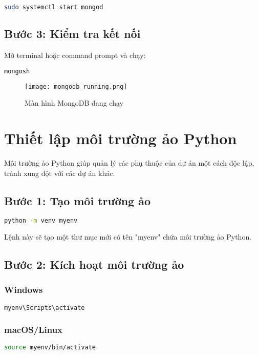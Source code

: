 \documentclass[12pt,a4paper]{article}
\begin{document}
\begin{lstlisting}[language=bash]
sudo systemctl start mongod
\end{lstlisting}

\subsection{Bước 3: Kiểm tra kết nối}

Mở terminal hoặc command prompt và chạy:

\begin{lstlisting}[language=bash]
mongosh
\end{lstlisting}

\begin{figure}[h]
    \centering
    \texttt{[image: mongodb\_running.png]}
    \caption{Màn hình MongoDB đang chạy}
    \label{fig:mongodb-running}
\end{figure}

\section{Thiết lập môi trường ảo Python}

Môi trường ảo Python giúp quản lý các phụ thuộc của dự án một cách độc lập, tránh xung đột với các dự án khác.

\subsection{Bước 1: Tạo môi trường ảo}

\begin{lstlisting}[language=bash]
python -m venv myenv
\end{lstlisting}

Lệnh này sẽ tạo một thư mục mới có tên "myenv" chứa môi trường ảo Python.

\subsection{Bước 2: Kích hoạt môi trường ảo}

\subsubsection{Windows}
\begin{lstlisting}[language=bash]
myenv\Scripts\activate
\end{lstlisting}

\subsubsection{macOS/Linux}
\begin{lstlisting}[language=bash]
source myenv/bin/activate
\end{lstlisting}
\end{document}

